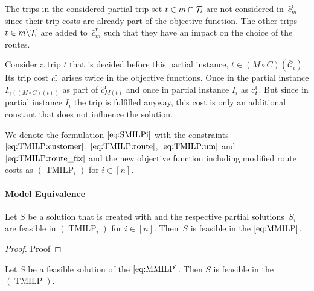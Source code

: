 \begin{remark}

The trips in the considered partial trip set $t\in m\cap\mathcal{T}_i$ are not considered in~$\hat{c}^{\operatorname{r}}_m$ since their trip costs are already part of the objective function. The other trips ${t\in m\backslash\mathcal{T}_i}$ are added to~$\hat{c}^{\operatorname{r}}_m$ such that they have an impact on the choice of the routes.

Consider a trip $t$  that is decided before this partial instance, \ie ${t\in(M\circ C)\left(\overline{\mathcal{C}}_i\right)}$. Its trip cost $c^{\operatorname{t}}_t$ arises twice in the objective functions. Once in the partial instance $I_{\gamma\left((M\circ C)(t)\right)}$ as part of $\hat{c}^{\operatorname{r}}_{M(t)}$ and once in partial instance $I_i$ as $c^{\operatorname{t}}_t$. But since in partial instance $I_i$ the trip is fulfilled anyway, this cost is only an additional constant that does not influence the solution. 

\end{remark}

We denote the formulation $\eqref{eq:SMILPi}$ with the constraints $\eqref{eq:TMILP:customer}$, $\eqref{eq:TMILP:route}$, $\eqref{eq:TMILP:um}$ and $\eqref{eq:TMILP:route_fix}$ and the new objective function including modified route costs as $(\operatorname{TMILP}_i)$ for $i\in[n]$.

\paragraph{Model Equivalence} \parfill

\begin{theorem}
\label{thm:equivalence_TMILP_MMILP}

Let $S$ be a solution that is created with  and the respective partial solutions~$S_i$ are feasible in $(\operatorname{TMILP}_i)$ for ${i\in[n]}$. Then~$S$ is feasible in the $\eqref{eq:MMILP}$.

\end{theorem}

\begin{proof}

Proof

\end{proof}

\begin{theorem}
\label{thm:equivalence_MMILP_TMILP}

Let $S$ be a feasible solution of the $\eqref{eq:MMILP}$. Then $S$ is feasible in the $(\operatorname{TMILP})$.

\end{theorem}

